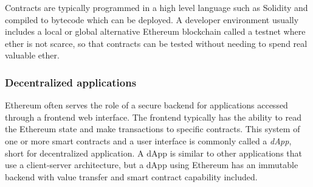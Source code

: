 Contracts are typically programmed in a high level language such as Solidity and compiled to bytecode which can be deployed. A developer environment usually includes a local or global alternative Ethereum blockchain called a testnet where ether is not scarce, so that contracts can be tested without needing to spend real valuable ether.

\subsubsection{Decentralized applications}
Ethereum often serves the role of a secure backend for applications accessed through a frontend web interface. The frontend typically has the ability to read the Ethereum state and make transactions to specific contracts. This system of one or more smart contracts and a user interface is commonly called a \emph{dApp}, short for decentralized application. A dApp is similar to other applications that use a client-server architecture, but a dApp using Ethereum has an immutable backend with value transfer and smart contract capability included.
